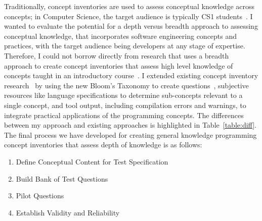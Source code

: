 Traditionally, concept inventories are used to  assess conceptual knowledge across concepts; in Computer Science, the target audience is typically CS1 students~\cite{tew2010developing,kaczmarczyk2010identifying}. 
I wanted to evaluate the potential for a depth versus breadth approach to assessing conceptual knowledge, that incorporates software engineering concepts and practices, with the target audience being developers at any stage of expertise.
Therefore, I could not borrow directly from research that uses a breadth approach to create concept inventories that assess high level knowledge of concepts taught in an introductory course~\cite{tew2010assessing}. I extended existing concept inventory research~\cite{tew2010developing,nelson1967testing} by using the new Bloom's Taxonomy to create questions~\cite{scott2003bloom,thompson2008bloom, starr2008bloom}, subjective resources like language specifications to determine sub-concepts relevant to a single concept, and tool output, including compilation errors and warnings, to integrate practical applications of the programming concepts. The differences between my approach and existing approaches is highlighted in Table~\ref{table:diff}.
The final process we have developed for creating general knowledge programming concept inventories that assess depth of knowledge is as follows:

\begin{enumerate}
    \item Define Conceptual Content for Test Specification
    \item Build Bank of Test Questions
    \item Pilot Questions
    \item Establish Validity and Reliability
\end{enumerate}




